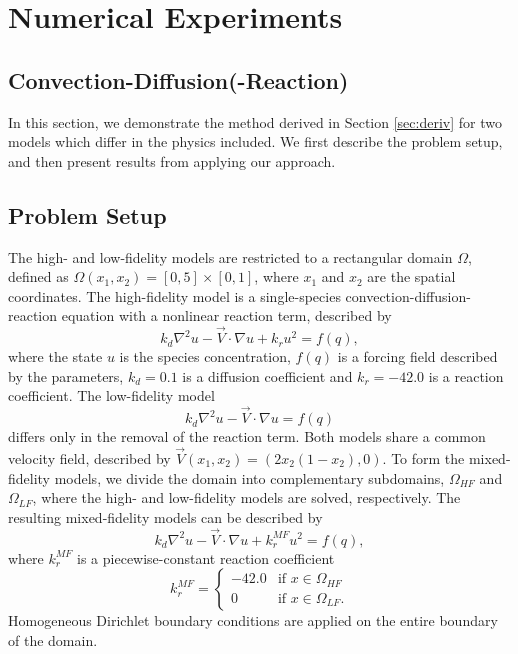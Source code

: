 \section{Numerical Experiments}\label{sect:numexp}

\subsection{Convection-Diffusion(-Reaction)} \label{sec:cdvcdr}

In this section, we demonstrate the method derived in Section \ref{sec:deriv} for two models which differ in the physics included. We first describe the problem setup, and then present results from applying our approach.

\subsection{Problem Setup} \label{sec:cdvcdrSetup}

The high- and low-fidelity models are restricted to a rectangular domain $\Omega$, defined as $\Omega(x_1,x_2)=[0,5]\times[0,1]$, where $x_1$ and $x_2$ are the spatial coordinates. The high-fidelity model is a single-species convection-diffusion-reaction equation with a nonlinear reaction term, described by
\begin{equation}
k_d\nabla^2 u - \vec{V}\cdot\nabla u + k_ru^2= f(q),
\label{eq:cdvcdrHF}
\end{equation}
where the state $u$ is the species concentration, $f(q)$ is a forcing field described by the parameters, $k_d = 0.1$ is a diffusion coefficient and $k_r = -42.0$ is a reaction coefficient. The low-fidelity model
\begin{equation}
k_d\nabla^2 u - \vec{V}\cdot\nabla u = f(q)
\end{equation}
differs only in the removal of the reaction term. Both models share a common velocity field, described by $\vec{V}(x_1,x_2) = (2x_2(1-x_2),0)$. To form the mixed-fidelity models, we divide the domain into complementary subdomains, $\Omega_{HF}$ and $\Omega_{LF}$, where the high- and low-fidelity models are solved, respectively. The resulting mixed-fidelity models can be described by 
\begin{equation}
k_d\nabla^2 u - \vec{V}\cdot\nabla u + k^{MF}_ru^2= f(q),
\end{equation}
where $k^{MF}_r$ is a piecewise-constant reaction coefficient
\begin{equation}
k^{MF}_r=
\begin{cases}
-42.0 & \textrm{if }x\in\Omega_{HF} \\
0 & \textrm{if }x\in\Omega_{LF}.
\end{cases}
\end{equation}
Homogeneous Dirichlet boundary conditions are applied on the entire boundary of the domain.

